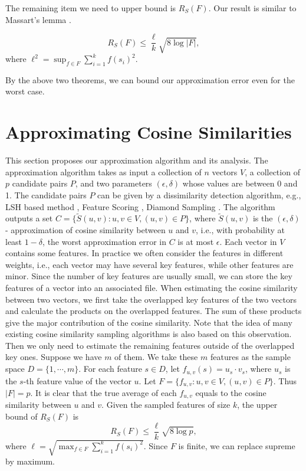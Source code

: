 \documentclass{article}
\begin{document}
The remaining item we need to upper bound is $R_S(F)$. Our result is similar to Massart's lemma \cite{AGO14}.

\begin{theorem}
\label{thm2}
$$R_S(F) \leq \frac{\ell}{k}\sqrt{8\log |F|},$$
where $\ell^2 = \sup_{f\in F}\sum_{i=1}^k f(s_i)^2$.
\end{theorem}

By the above two theorems, we can bound our approximation error even for the worst case.


\section{Approximating Cosine Similarities}
\label{sec:acs}
This section proposes our approximation algorithm and its analysis.
{\color{black}
The approximation algorithm takes as input a collection of $n$ vectors $V$, a collection of $p$ candidate pairs $P$, and two parameters $(\epsilon, \delta)$ whose values are between 0 and 1. The candidate pairs $P$ can be given by a dissimilarity detection algorithm, e.g., LSH based method \cite{LRU14}, Feature Scoring \cite{CL99}, Diamond Sampling \cite{BKP15}. The algorithm outputs a set $C = \{\tilde{S}(u,v): u,v \in V, (u,v)\in P\}$, where $\tilde{S}(u,v)$ is the $(\epsilon, \delta)$- approximation of cosine similarity between $u$ and $v$, i.e., with probability at least $1-\delta$, the worst approximation error in $C$ is at most $\epsilon$. Each vector in $V$ contains some features. In practice we often consider the features in different weights, i.e., each vector may have several key features, while other features are minor. Since the number of key features are usually small, we can store the key features of a vector into an associated file. When estimating the cosine similarity between two vectors, we first take the overlapped key features of the two vectors and calculate the products on the overlapped features. The sum of these products give the major contribution of the cosine similarity. Note that the idea of many existing cosine similarity sampling algorithms \cite{CL99,BKP15} is also based on this observation. Then we only need to estimate the remaining features outside of the overlapped key ones. Suppose we have $m$ of them. We take these $m$ features as the sample space $D = \{1,\cdots,m\}$. For each feature $s\in D$, let $f_{u,v}(s) = u_s\cdot v_s$, where $u_s$ is the $s$-th feature value of the vector $u$. Let $F = \{f_{u,v}: u,v\in V, (u,v)\in P\}$. Thus $|F| = p$. It is clear that the true average of each $f_{u,v}$ equals to the cosine similarity between $u$ and $v$. Given the sampled features of size $k$, the upper bound of $R_S(F)$ is 
$$R_S(F) \leq \frac{\ell}{k}\sqrt{8\log p},$$
where $\ell = \sqrt{\max_{f\in F} \sum_{i=1}^k f(s_i)^2}$. Since $F$ is finite, we can replace supreme by maximum. 
}
\end{document}
